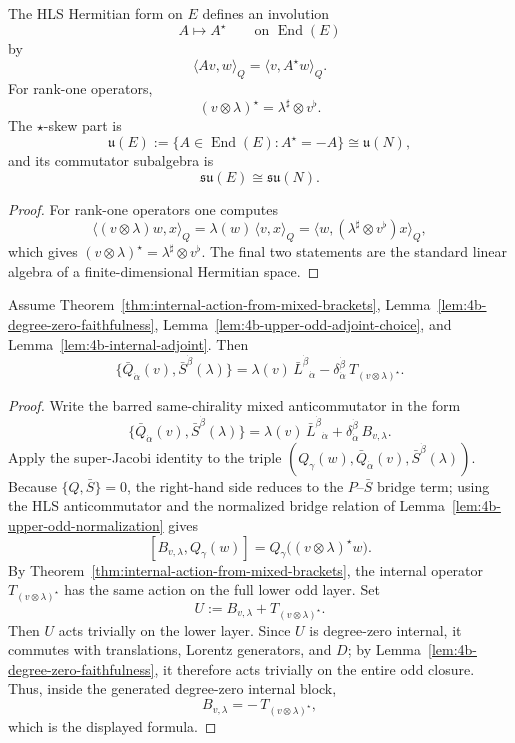 \begin{lemma}
\label{lem:4b-internal-adjoint}
The HLS Hermitian form on \(E\) defines an involution
\[
  A\longmapsto A^\star
  \qquad
  \text{on }\operatorname{End}(E)
\]
by
\[
  \langle Av,w\rangle_Q=\langle v,A^\star w\rangle_Q.
\]
For rank-one operators,
\[
  (v\otimes\lambda)^\star=\lambda^\sharp\otimes v^\flat.
\]
The \(\star\)-skew part is
\[
  \mathfrak u(E)
  :=
  \{A\in\operatorname{End}(E):A^\star=-A\}
  \cong
  \mathfrak u(N),
\]
and its commutator subalgebra is
\[
  \mathfrak{su}(E)\cong\mathfrak{su}(N).
\]
\end{lemma}

\begin{proof}
For rank-one operators one computes
\[
\langle (v\otimes\lambda)w,x\rangle_Q
=
\lambda(w)\,\langle v,x\rangle_Q
=
\langle w,(\lambda^\sharp\otimes v^\flat)x\rangle_Q,
\]
which gives \((v\otimes\lambda)^\star=\lambda^\sharp\otimes v^\flat\). The final
two statements are the standard linear algebra of a finite-dimensional Hermitian
space.
\end{proof}

\begin{corollary}
\label{cor:4b-barred-mixed-formula}
Assume Theorem~\ref{thm:internal-action-from-mixed-brackets},
Lemma~\ref{lem:4b-degree-zero-faithfulness},
Lemma~\ref{lem:4b-upper-odd-adjoint-choice}, and
Lemma~\ref{lem:4b-internal-adjoint}. Then
\[
\{\bar Q_{\dot\alpha}(v),\bar S^{\dot\beta}(\lambda)\}
=
\lambda(v)\,\bar L^{\dot\beta}{}_{\dot\alpha}
-\delta_{\dot\alpha}^{\dot\beta}\,T_{(v\otimes\lambda)^\star}.
\]
\end{corollary}

\begin{proof}
Write the barred same-chirality mixed anticommutator in the form
\[
\{\bar Q_{\dot\alpha}(v),\bar S^{\dot\beta}(\lambda)\}
=
\lambda(v)\,\bar L^{\dot\beta}{}_{\dot\alpha}
+\delta_{\dot\alpha}^{\dot\beta}\,B_{v,\lambda}.
\]
Apply the super-Jacobi identity to the triple
\((Q_\gamma(w),\bar Q_{\dot\alpha}(v),\bar S^{\dot\beta}(\lambda))\). Because
\(\{Q,\bar S\}=0\), the right-hand side reduces to the \(P\)--\(\bar S\) bridge
term; using the HLS anticommutator and the normalized bridge relation of
Lemma~\ref{lem:4b-upper-odd-normalization} gives
\[
  [B_{v,\lambda},Q_\gamma(w)]
  =
  Q_\gamma\bigl((v\otimes\lambda)^\star w\bigr).
\]
By Theorem~\ref{thm:internal-action-from-mixed-brackets}, the internal operator
\(T_{(v\otimes\lambda)^\star}\) has the same action on the full lower odd layer.
Set
\[
  U:=B_{v,\lambda}+T_{(v\otimes\lambda)^\star}.
\]
Then \(U\) acts trivially on the lower layer. Since \(U\) is degree-zero
internal, it commutes with translations, Lorentz generators, and \(D\); by
Lemma~\ref{lem:4b-degree-zero-faithfulness}, it therefore acts trivially on the
entire odd closure. Thus, inside the generated degree-zero internal block,
\[
  B_{v,\lambda}=-\,T_{(v\otimes\lambda)^\star},
\]
which is the displayed formula.
\end{proof}

